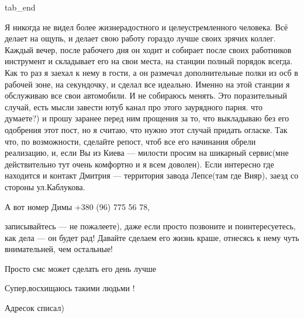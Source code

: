   tab_end
\fi

Я никогда не видел более жизнерадостного и
целеустремленного человека. Всё делает на ощупь, и делает свою работу гораздо
лучше своих зрячих коллег. Каждый вечер, после рабочего дня он ходит и собирает
после своих работников инструмент и складывает его на свои места, на станции
полный порядок всегда. Как то раз я заехал к нему в гости, а он размечал
дополнительные полки из осб в рабочей зоне, на секундочку, и сделал все
идеально. Именно на этой станции я обслуживаю все свои автомобили. И не
собираюсь менять. Это поразительный случай, есть мысли завести ютуб канал про
этого заурядного парня. что думаете?) и прошу заранее перед ним прощения за то,
что выкладываю без его одобрения этот пост, но я считаю, что нужно этот случай
придать огласке. Так что, по возможности, сделайте репост, чтоб все его
начинания обрели реализацию, и, если Вы из Киева — милости просим на шикарный
сервис(мне действительно тут очень комфортно и я всем доволен). Если интересно
где находится и контакт Дмитрия — территория завода Лепсе(там где Вияр), заезд
со стороны ул.Каблукова.

А вот номер Димы +380 (96) 775 56 78,

записывайтесь — не пожалеете), даже если просто позвоните и поинтересуетесь,
как дела — он будет рад! Давайте сделаем его жизнь краше, отнесясь к нему чуть
внимательней, чем остальные! 

Просто смс может сделать его день лучше

\begin{itemize} %
Супер,восхищаюсь такими людьми !

Адресок списал)
\end{itemize} %
